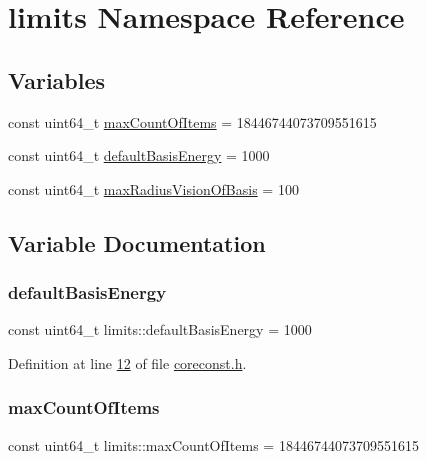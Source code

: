 \hypertarget{a00115}{}\section{limits Namespace Reference}
\label{a00115}
\subsection*{Variables}
\begin{DoxyCompactItemize}
\item 
const uint64\+\_\+t \hyperlink{a00115_a1fe7215d57cdf80c6fbd71a16853dcd2}{max\+Count\+Of\+Items} = 18446744073709551615
\item 
const uint64\+\_\+t \hyperlink{a00115_a5ece0bc57b69f35c537f34cc06b620f5}{default\+Basis\+Energy} = 1000
\item 
const uint64\+\_\+t \hyperlink{a00115_aa57018b6545bade5e6f69133071a1342}{max\+Radius\+Vision\+Of\+Basis} = 100
\end{DoxyCompactItemize}


\subsection{Variable Documentation}
\mbox{\label{a00115_a5ece0bc57b69f35c537f34cc06b620f5}} 
\subsubsection{\texorpdfstring{default\+Basis\+Energy}{defaultBasisEnergy}}
{\footnotesize\ttfamily const uint64\+\_\+t limits\+::default\+Basis\+Energy = 1000}



Definition at line \hyperlink{a00020_source_l00012}{12} of file \hyperlink{a00020_source}{coreconst.\+h}.

\mbox{\label{a00115_a1fe7215d57cdf80c6fbd71a16853dcd2}} 
\subsubsection{\texorpdfstring{max\+Count\+Of\+Items}{maxCountOfItems}}
{\footnotesize\ttfamily const uint64\+\_\+t limits\+::max\+Count\+Of\+Items = 18446744073709551615}



